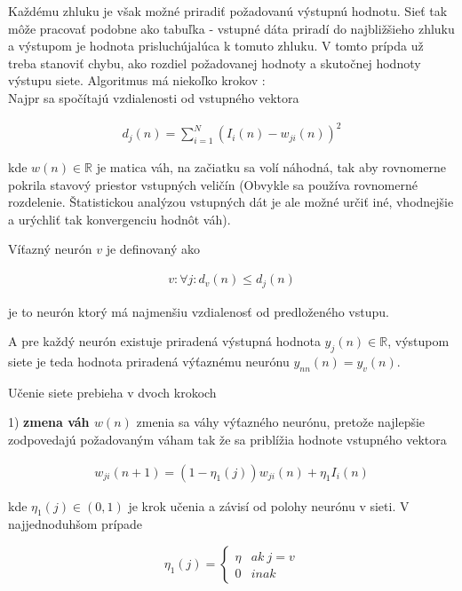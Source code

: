 Každému zhluku je však možné priradiť požadovanú výstupnú hodnotu. Sieť tak môže
pracovať podobne ako tabuľka - vstupné dáta priradí do najbližšieho zhluku a výstupom
je hodnota prisluchújalúca k tomuto zhluku. V tomto prípda už treba stanoviť chybu,
ako rozdiel požadovanej hodnoty a skutočnej hodnoty výstupu siete.
Algoritmus má niekoľko krokov :
\\
Najpr sa spočítajú vzdialenosti od vstupného vektora

\begin{align}
d_j(n) = \sum\limits_{i=1}^{N}{(I_i(n) - w_{ji}(n))^2}
\label{eq:knn_distance}
\end{align}

kde $w(n) \in \mathbb{R}$ je matica váh, na začiatku sa volí náhodná, tak
aby rovnomerne pokrila stavový priestor vstupných veličín (Obvykle sa používa rovnomerné
rozdelenie. Štatistickou analýzou vstupných dát je ale možné určiť iné, vhodnejšie
a urýchliť tak konvergenciu hodnôt váh).

Víťazný neurón $v$ je definovaný ako

\begin{align}
v : \forall j : d_v(n) \leq d_j(n)
\label{eq:knn_winning}
\end{align}

je to neurón ktorý má najmenšiu vzdialenosť od predloženého vstupu.

A pre každý neurón existuje priradená výstupná hodnota $y_j(n) \in \mathbb{R}$, výstupom
siete je teda hodnota priradená výťaznému neurónu $y_{nn}(n) = y_v(n)$.


Učenie siete prebieha v dvoch krokoch

{1) \bf zmena váh $w(n)$ } zmenia sa váhy výťazného neurónu, pretože najlepšie
zodpovedajú požadovaným váham tak že sa priblížia hodnote vstupného vektora

\begin{align}
w_{ji}(n+1) = (1-\eta_1(j))w_{ji}(n) + \eta_1 I_i(n)
\label{eq:knn_w_update}
\end{align}

kde $\eta_1(j) \in (0, 1)$ je krok učenia a závisí od polohy neurónu v sieti.
V najjednoduhšom prípade

\begin{equation}
\eta_1(j) =
\left\{
	\begin{array}{ll}
		\eta  & ak \ j = v \\
		0 & inak
	\end{array}
\right.
\label{eq:knn_func_simple1}
\end{equation}

